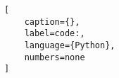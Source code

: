 \begin{onepage}
    \begin{lstlisting}[
    caption={},
    label=code:,
    language={Python},
    numbers=none
]

    \end{lstlisting}
\end{onepage}
